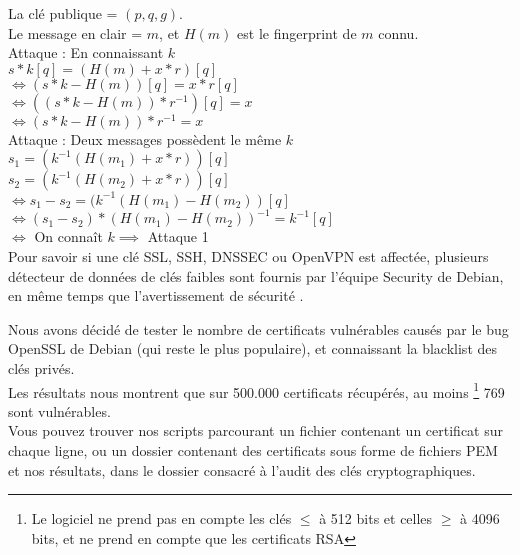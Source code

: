 			La clé publique = $(p, q, g)$.\\
			Le message en clair = $m$, et $H(m)$ est le fingerprint de $m$ connu.\\
		
			Attaque  : En connaissant $k$	\\
			$s * k [q] = (H(m) + x*r) [q]$\\
			$\iff (s * k - H(m)) [q] = x*r [q]$\\
			$\iff ((s*k - H(m))*r^{-1})[q] = x$\\
			$\iff (s*k - H(m))*r^{-1} = x$\\
	
			Attaque  : Deux messages possèdent le même $k$\\
			$s_1 = (k^{-1} (H(m_1) + x*r)) [q]$\\
			$s_2 = (k^{-1} (H(m_2) + x*r)) [q]$\\
			$\iff s_1 - s_2 = (k^{-1} (H(m_1) - H(m_2)) [q]$\\
			$\iff (s_1 - s_2)*(H(m_1) - H(m_2))^{-1} = k^{-1} [q]$\\
			$\iff$ On connaît $k \implies$ Attaque 1\\
	
			Pour savoir si une clé SSL, SSH, DNSSEC ou OpenVPN est affectée, 
			plusieurs détecteur de données \cite{dowkd.pl} 
			\cite{openssl-blacklist} de clés faibles sont 
			fournis par l'équipe Security de Debian, en même temps que
			l'avertissement de sécurité \cite{debian2008bug}.\\ 
	
	
			Nous avons décidé de tester le nombre de certificats vulnérables 
			causés 	par le bug OpenSSL de Debian (qui reste le plus populaire), et
			connaissant la blacklist des clés privés. \\
		
			Les résultats nous montrent que sur 500.000 certificats récupérés, au moins
			\footnote{Le logiciel ne prend pas en compte les clés $\leq$ à 512 bits et 
			celles $\geq$ à 4096 bits, et ne prend en compte que les certificats RSA} 
			769 sont vulnérables.\\
			
			Vous pouvez trouver nos scripts parcourant un fichier contenant un 
			certificat sur chaque ligne, ou un dossier contenant des certificats sous 
			forme de fichiers PEM et nos résultats, dans le dossier consacré à l'audit des clés
			cryptographiques.\\
			
